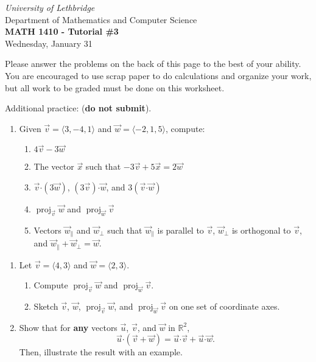 \documentclass[12pt]{article}
\newcommand{\skipline}{\vspace{12pt}}
\newcommand{\R}{\mathbb{R}}
\newcommand{\dotp}{\boldsymbol{\cdot}}
\DeclareMathOperator{\proj}{proj}
\begin{document}
\author{Instructor: Sean Fitzpatrick}
\thispagestyle{empty}
\begin{center}
\emph{University of Lethbridge}\\
Department of Mathematics and Computer Science\\
{\bf MATH 1410 - Tutorial \#3}\\
Wednesday, January 31
\end{center}
\skipline \skipline \skipline \noindent \skipline

\vspace*{\fill}


Please answer the problems on the back of this page to the best of your ability. You are encouraged to use scrap paper to do calculations and organize your work, but all work to be graded must be done on this worksheet.

\bigskip

Additional practice: (\textbf{do not submit}).
\begin{enumerate}
\item Given $\vec{v}=\langle 3,-4,1\rangle$ and $\vec{w} = \langle -2,1,5\rangle$, compute:
\begin{enumerate}
\item $4\vec{v}-3\vec{w}$
\item The vector $\vec{x}$ such that $-3\vec{v}+5\vec{x}=2\vec{w}$
\item $\vec{v}\dotp (3\vec{w})$, $(3\vec{v})\dotp \vec{w}$, and $3(\vec{v}\dotp \vec{w})$
\item $\proj_{\vec{v}}\vec{w}$ and $\proj_{\vec{w}}\vec{v}$
\item Vectors $\vec{w}_{\parallel}$ and $\vec{w}_{\bot}$ such that $\vec{w}_{\parallel}$ is parallel to $\vec{v}$, $\vec{w}_{\bot}$ is orthogonal to $\vec{v}$, and $\vec{w}_{\parallel}+\vec{w}_{\bot}=\vec{w}$.
\end{enumerate}
\end{enumerate}

\newpage

  \begin{enumerate}
    \item Let $\vec{v} = \langle 4,3\rangle$ and $\vec{w} = \langle 2,3\rangle$.
    \begin{enumerate}
    \item Compute $\proj_{\vec{v}}\vec{w}$ and $\proj_{\vec{w}}\vec{v}$.
    \item Sketch $\vec{v}$, $\vec{w}$, $\proj_{\vec{v}}\vec{w}$, and $\proj_{\vec{w}}\vec{v}$ on one set of coordinate axes.
    \end{enumerate}
    
    \vspace{4in}
    
    \item Show that for \textbf{any} vectors $\vec{u}$, $\vec{v}$, and $\vec{w}$ in $\R^2$,
    \[
    \vec{u}\dotp (\vec{v}+\vec{w}) = \vec{u}\dotp\vec{v}+\vec{u}\dotp \vec{w}.
    \]
    Then, illustrate the result with an example.
    
    
    
   
\end{enumerate}
  
\end{document}
